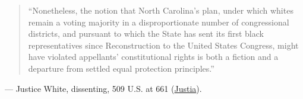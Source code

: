\documentclass[12pt]{article}
\begin{document}
\begin{quote}
``Nonetheless, the notion that North Carolina's plan, under which whites remain a voting majority in a disproportionate number of congressional districts, and pursuant to which the State has sent its first black representatives since Reconstruction to the United States Congress, might have violated appellants' constitutional rights is both a fiction and a departure from settled equal protection principles.''
\end{quote}
\noindent --- Justice White, dissenting, 509 U.S. at 661 (\href{https://supreme.justia.com/cases/federal/us/509/630/}{Justia}).
\end{document}
